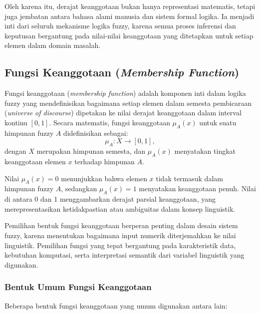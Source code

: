 \documentclass[12pt,a4paper]{article}
\theoremstyle{remark}
\begin{document}
Oleh karena itu, derajat keanggotaan bukan hanya representasi matematis, tetapi juga jembatan antara bahasa alami manusia dan sistem formal logika. Ia menjadi inti dari seluruh mekanisme logika fuzzy, karena semua proses inferensi dan keputusan bergantung pada nilai-nilai keanggotaan yang ditetapkan untuk setiap elemen dalam domain masalah.


\subsection{Fungsi Keanggotaan (\textit{Membership Function})}
Fungsi keanggotaan (\textit{membership function}) adalah komponen inti dalam logika fuzzy yang mendefinisikan bagaimana setiap elemen dalam semesta pembicaraan (\textit{universe of discourse}) dipetakan ke nilai derajat keanggotaan dalam interval kontinu \([0,1]\). Secara matematis, fungsi keanggotaan \(\mu_A(x)\) untuk suatu himpunan fuzzy \(A\) didefinisikan sebagai:
\[
    \mu_A: X \rightarrow [0,1],
\]
dengan \(X\) merupakan himpunan semesta, dan \(\mu_A(x)\) menyatakan tingkat keanggotaan elemen \(x\) terhadap himpunan \(A\).

Nilai \(\mu_A(x) = 0\) menunjukkan bahwa elemen \(x\) tidak termasuk dalam himpunan fuzzy \(A\), sedangkan \(\mu_A(x) = 1\) menyatakan keanggotaan penuh. Nilai di antara 0 dan 1 menggambarkan derajat parsial keanggotaan, yang merepresentasikan ketidakpastian atau ambiguitas dalam konsep linguistik.

Pemilihan bentuk fungsi keanggotaan berperan penting dalam desain sistem fuzzy, karena menentukan bagaimana input numerik diterjemahkan ke nilai linguistik. Pemilihan fungsi yang tepat bergantung pada karakteristik data, kebutuhan komputasi, serta interpretasi semantik dari variabel linguistik yang digunakan.

\subsubsection{Bentuk Umum Fungsi Keanggotaan}
Beberapa bentuk fungsi keanggotaan yang umum digunakan antara lain:
\end{document}
